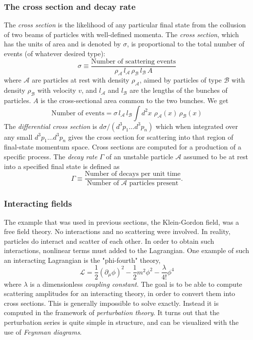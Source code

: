 \subsubsection{The cross section and decay rate}
\label{sec:cross-section}

The \emph{cross section} is the likelihood of any particular final state from the collusion of two beams of particles with well-defined momenta. The \emph{cross section}, which has the units of area and is denoted by $\sigma$, is proportional to the total number of events (of whatever desired type):
\begin{equation}
\sigma \equiv \frac{\text{Number of scattering events}}{\rho_\mathcal{A}\,l_\mathcal{A}\,\rho_\mathcal{B}\,l_\mathcal{B}\,A}
\end{equation}
where $\mathcal{A}$ are particles at rest with density $\rho_\mathcal{A}$, aimed by particles of type $\mathcal{B}$ with density $\rho_\mathcal{B}$ with velocity $v$, and $l_\mathcal{A}$ and $l_\mathcal{B}$ are the lengths of the bunches of particles. $A$ is the cross-sectional area common to the two bunches. We get
\begin{equation}
\text{Number of events} = \sigma\,l_\mathcal{A}\,l_\mathcal{B}\int d^2 x\,\, \rho_\mathcal{A}(x)\,\rho_\mathcal{B}(x)
\end{equation}
The \emph{differential cross section} is $d\sigma/(d^3 p_1\ldots d^3p_n)$ which when integrated over any small $d^3 p_1\ldots d^3p_n$ gives the cross section for scattering into that region of final-state momentum space. Cross sections are computed for a production of a specific process. The \emph{decay rate} $\Gamma$ of an unstable particle $\mathcal{A}$ assumed to be at rest into a specified final state is defined as
\begin{equation}
\Gamma \equiv \frac{\text{Number of decays per unit time}}{\text{Number of $\mathcal{A}$ particles present}}.
\end{equation}

\subsubsection{Interacting fields}

The example that was used in previous sections, the Klein-Gordon field, was a free field theory. No interactions and no scattering were involved. In reality, particles do interact and scatter of each other. In order to obtain such interactions, nonlinear terms must added to the Lagrangian. One example of such an interacting Lagrangian is the "phi-fourth" theory,
\begin{equation}
\mathcal{L} = \frac{1}{2}(\partial_\mu\phi)^2-\frac{1}{2}m^2\phi^2 -\frac{\lambda}{4!}\phi^4
\end{equation}
where $\lambda$ is a dimensionless \emph{coupling constant}. The goal is to be able to compute scattering amplitudes for an interacting theory, in order to convert them into cross sections. This is generally impossible to solve exactly. Instead it is computed in the framework of \emph{perturbation theory}. It turns out that the perturbation series is quite simple in structure, and can be visualized with the use of \emph{Feynman diagrams}.

